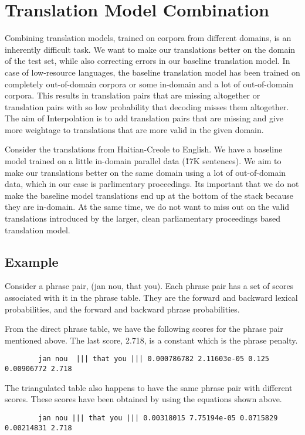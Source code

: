 \section{Translation Model Combination}
\label{sec:interpolation}
Combining translation models, trained on corpora from different domains, is an inherently difficult task. We want to make our translations better on the domain of the test set, while also correcting errors in our baseline translation model. In case of low-resource languages, the baseline translation model has been trained on completely out-of-domain corpora or some in-domain and a lot of out-of-domain corpora. This results in translation pairs that are missing altogether or translation pairs with so low probability that decoding misses them altogether. The aim of Interpolation is to add translation pairs that are missing and give more weightage to translations that are more valid in the given domain. 

	Consider the translations from Haitian-Creole to English. We have a baseline model trained on a little in-domain parallel data (\~17K sentences). We aim to make our translations better on the same domain using a lot of out-of-domain data, which in our case is parlimentary proceedings. Its important that we do not make the baseline model translations end up at the bottom of the stack because they are in-domain. At the same time, we do not want to miss out on the valid translations introduced by the larger, clean parliamentary proceedings based translation model. 

	\subsection{Example}
		Consider a phrase pair, (jan nou, that you). Each phrase pair has a set of scores associated with it in the phrase table. They are the forward and backward lexical probabilities, and the forward and backward phrase probabilities. 

		From the direct phrase table, we have the following scores for the phrase pair mentioned above. The last score, 2.718, is a constant which is the phrase penalty. 
	\begin{verbatim}
		jan nou  ||| that you ||| 0.000786782 2.11603e-05 0.125 0.00906772 2.718 
	\end{verbatim}

		The triangulated table also happens to have the same phrase pair with different scores. These scores have been obtained by using the equations shown above.
	\begin{verbatim}
		jan nou ||| that you ||| 0.00318015 7.75194e-05 0.0715829 0.00214831 2.718
	\end{verbatim}

